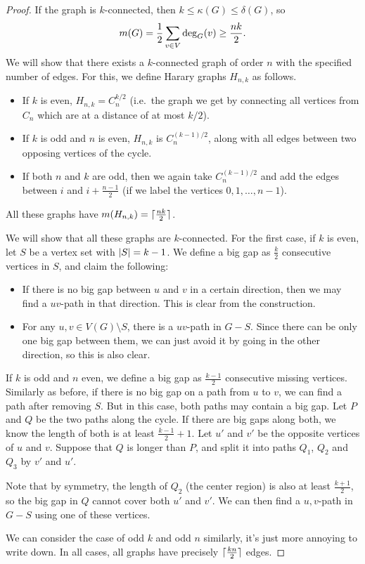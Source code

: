 \begin{proof}
  If the graph is $k$-connected, then $k \le \kappa(G) \le \delta(G)$, so
  \[
	m(G) = \frac{1}{2} \sum_{v \in V} \deg_G(v) \ge \frac{nk}{2}.
  \]
  We will show that there exists a $k$-connected graph of order $n$ with the
  specified number of edges.
  For this, we define Harary graphs $H_{n,k}$ as follows.
  \begin{itemize}
  \item If $k$ is even, $H_{n,k} = C_n^{k/2}$ (i.e.~the graph we get by
	connecting all vertices from $C_n$ which are at a distance of at most $k/2$).
  \item If $k$ is odd and $n$ is even, $H_{n,k}$ is $C_n^{(k-1)/2}$, along with
	all edges between two opposing vertices of the cycle.
  \item If both $n$ and $k$ are odd, then we again take $C_n^{(k-1)/2}$ and add
	the edges between $i$ and $i + \frac{n-1}{2}$ (if we label the vertices $0,
	1, \ldots, n-1$).
  \end{itemize}
  All these graphs have $m(H_{n,k}) = \lceil \frac{nk}{2} \rceil$.

  We will show that all these graphs are $k$-connected.
  For the first case, if $k$ is even, let $S$ be a vertex set with $\left| S \right| =
  k-1$.
  We define a big gap as $\frac{k}{2}$ consecutive vertices in $S$, and claim
  the following:
  \begin{itemize}
  \item If there is no big gap between $u$ and $v$ in a certain direction, then
	we may find a $uv$-path in that direction.
	This is clear from the construction.
  \item For any $u,v \in V(G) \setminus S$, there is a $uv$-path in $G - S$.
	Since there can be only one big gap between them, we can just avoid it by
	going in the other direction, so this is also clear.
  \end{itemize}

  If $k$ is odd and $n$ even, we define a big gap as $\frac{k-1}{2}$ consecutive
  missing vertices.
  Similarly as before, if there is no big gap on a path from $u$ to $v$, we can
  find a path after removing $S$.
  But in this case, both paths may contain a big gap.
  Let $P$ and $Q$ be the two paths along the cycle.
  If there are big gaps along both, we know the length of both is at least
  $\frac{k-1}{2} + 1$.
  Let $u'$ and $v'$ be the opposite vertices of $u$ and $v$.
  Suppose that $Q$ is longer than $P$, and split it into paths $Q_1$, $Q_2$ and
  $Q_3$ by $v'$ and $u'$.

  Note that by symmetry, the length of $Q_2$ (the center region) is also at
  least $\frac{k+1}{2}$, so the big gap in $Q$ cannot cover both $u'$ and $v'$.
  We can then find a $u,v$-path in $G - S$ using one of these vertices.

  We can consider the case of odd $k$ and odd $n$ similarly, it's just more
  annoying to write down.
  In all cases, all graphs have precisely $\lceil \frac{kn}{2} \rceil$ edges.
\end{proof}

